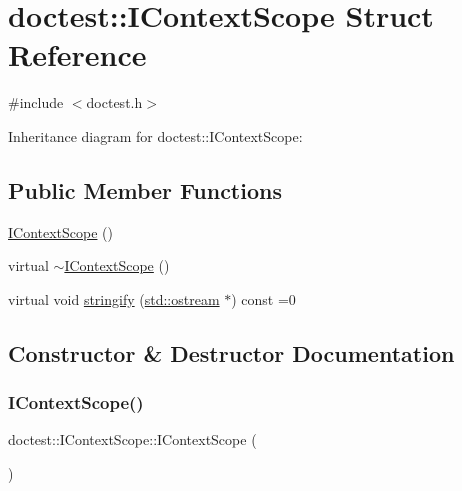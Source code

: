 \hypertarget{structdoctest_1_1_i_context_scope}{}\section{doctest\+:\+:I\+Context\+Scope Struct Reference}
\label{structdoctest_1_1_i_context_scope}


{\ttfamily \#include $<$doctest.\+h$>$}



Inheritance diagram for doctest\+:\+:I\+Context\+Scope\+:
\subsection*{Public Member Functions}
\begin{DoxyCompactItemize}
\item 
\hyperlink{structdoctest_1_1_i_context_scope_a067a2f9a9e53b010eb7b0a2ab88c76fd}{I\+Context\+Scope} ()
\item 
virtual \hyperlink{structdoctest_1_1_i_context_scope_aa99357c233d6a040451628bc6a6c6c2e}{$\sim$\+I\+Context\+Scope} ()
\item 
virtual void \hyperlink{structdoctest_1_1_i_context_scope_affbf0f9bf8107a4a8a805d237288141d}{stringify} (\hyperlink{doctest_8h_a116af65cb5e924b33ad9d9ecd7a783f3}{std\+::ostream} $\ast$) const =0
\end{DoxyCompactItemize}


\subsection{Constructor \& Destructor Documentation}
\mbox{\label{structdoctest_1_1_i_context_scope_a067a2f9a9e53b010eb7b0a2ab88c76fd}} 
\subsubsection{\texorpdfstring{I\+Context\+Scope()}{IContextScope()}}
{\footnotesize\ttfamily doctest\+::\+I\+Context\+Scope\+::\+I\+Context\+Scope (\begin{DoxyParamCaption}{ }\end{DoxyParamCaption})}

